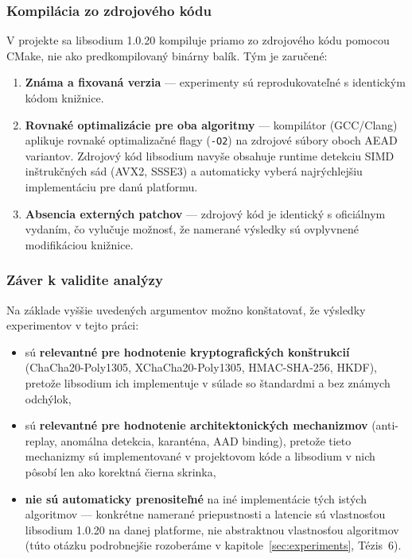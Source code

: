 \documentclass[journal,a4paper,onecolumn]{IEEEtran}
\begin{document}
\subsubsection{Kompilácia zo zdrojového kódu}

V projekte sa libsodium 1.0.20 kompiluje priamo zo zdrojového kódu pomocou CMake, nie ako predkompilovaný binárny balík. Tým je zaručené:

\begin{enumerate}[leftmargin=*,itemsep=2pt]
  \item \textbf{Známa a fixovaná verzia} --- experimenty sú reprodukovateľné s identickým kódom knižnice.
  \item \textbf{Rovnaké optimalizácie pre oba algoritmy} --- kompilátor (GCC/Clang) aplikuje rovnaké optimalizačné flagy (\texttt{-O2}) na zdrojové súbory oboch AEAD variantov. Zdrojový kód libsodium navyše obsahuje runtime detekciu SIMD inštrukčných sád (AVX2, SSSE3) a automaticky vyberá najrýchlejšiu implementáciu pre danú platformu\cite{LibsodiumDoc}.
  \item \textbf{Absencia externých patchov} --- zdrojový kód je identický s oficiálnym vydaním, čo vylučuje možnosť, že namerané výsledky sú ovplyvnené modifikáciou knižnice.
\end{enumerate}

\subsubsection{Záver k validite analýzy}

Na základe vyššie uvedených argumentov možno konštatovať, že výsledky experimentov v tejto práci:
\begin{itemize}[leftmargin=*,itemsep=2pt]
  \item sú \textbf{relevantné pre hodnotenie kryptografických konštrukcií} (ChaCha20-Poly1305, XChaCha20-Poly1305, HMAC-SHA-256, HKDF), pretože libsodium ich implementuje v súlade so štandardmi a bez známych odchýlok,
  \item sú \textbf{relevantné pre hodnotenie architektonických mechanizmov} (anti-replay, anomálna detekcia, karanténa, AAD binding), pretože tieto mechanizmy sú implementované v projektovom kóde a libsodium v nich pôsobí len ako korektná čierna skrinka,
  \item \textbf{nie sú automaticky prenositeľné} na iné implementácie tých istých algoritmov --- konkrétne namerané priepustnosti a latencie sú vlastnosťou libsodium 1.0.20 na danej platforme, nie abstraktnou vlastnosťou algoritmov (túto otázku podrobnejšie rozoberáme v kapitole~\ref{sec:experiments}, Tézis~6).
\end{itemize}
\end{document}
